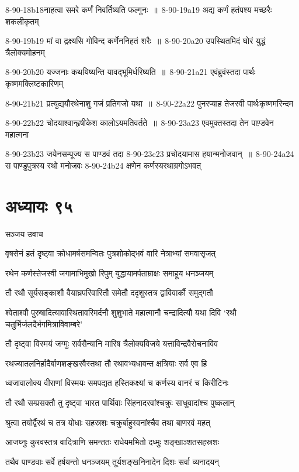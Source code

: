 8-90-18b18नाहत्वा समरे कर्णं निवर्तिष्यति फल्गुनः ॥ 8-90-19a19 अद्य कर्णं हतंपश्य मच्छरैः शकलीकृतम्

8-90-19b19 मां वा द्रक्ष्यसि गोविन्द कर्णेननिहतं शरैः ॥ 8-90-20a20 उपस्थितमिदं घोरं युद्धं त्रैलोक्यमोहनम्

8-90-20b20 यज्जनाः कथयिष्यन्ति यावद्भूमिर्धरिष्यति ॥ 8-90-21a21 एवंब्रुवंस्तदा पार्थः कृष्णमक्लिष्टकारिणम्

8-90-21b21 प्रत्युद्ययौरथेनाशु गजं प्रतिगजो यथा ॥ 8-90-22a22 पुनरप्याह तेजस्वी पार्थःकृष्णमरिन्दम

8-90-22b22 चोदयाश्वान्हृषीकेश कालोऽयमतिवर्तते ॥ 8-90-23a23 एवमुक्तस्तदा तेन पाण़्डवेन महात्मना

8-90-23b23 जयेनसम्पूज्य स पाण्डवं तदा 8-90-23c23 प्रचोदयामास हयान्मनोजवान् ॥ 8-90-24a24 स पाण्डुपुत्रस्य रथो मनोजवः 8-90-24b24 क्षणेन कर्णस्यरथाग्रगोऽभवत्
\chapter{अध्यायः ९५}
\twolineshloka
{सञ्जय उवाच}
{}


\twolineshloka
{वृषसेनं हतं दृष्ट्वा क्रोधामर्षसमन्वितः}
{पुत्रशोकोद्भवं वारि नेत्राभ्यां समवासृजत्}


\twolineshloka
{रथेन कर्णस्तेजस्वी जगामाभिमुखो रिपुम्}
{युद्धायामर्पताम्राक्षः समाहूय धनञ्जयम्}


\twolineshloka
{तौ रथौ सूर्यसङ्काशौ वैयाघ्रपरिवारितौ}
{समेतौ ददृशुस्तत्र द्वाविवार्कौ समुद्गतौ}


\threelineshloka
{श्वेताश्वौ पुरुषादित्यावास्थितावरिमर्दनौ}
{शुशुभाते महात्मानौ चन्द्रादित्यौ यथा दिवि}
{`रथौ चतुर्भिर्जलदैर्भगमित्राविवाम्बरे'}


\twolineshloka
{तौ दृष्ट्वा विस्मयं जग्मुः सर्वसैन्यानि मारिष}
{त्रैलोक्यविजये यत्ताविन्द्रवैरोचनाविव}


\twolineshloka
{रथज्यातलनिर्हादैर्बाणशङ्खरवैस्तथा}
{तौ रथावभ्यधावन्त क्षत्रियाः सर्व एव हि}


\twolineshloka
{ध्वजावालोक्य वीराणां विस्मयः समपद्यत}
{हस्तिकक्ष्यां च कर्णस्य वानरं च किरीटिनः}


\twolineshloka
{तौ रथौ सम्प्रसक्तौ तु दृष्ट्वा भारत पार्थिवाः}
{सिंहनादरवांश्चक्रुः साधुवादांश्च पुष्कलान्}


\twolineshloka
{श्रुत्वा तयोर्द्वैरथं च तत्र योधाः सहस्रशः}
{चक्रुर्बाहुस्वनांश्चैव तथा बाणरवं महत्}


\twolineshloka
{आजघ्नुः कुरवस्तत्र वादित्राणि समन्ततः}
{राधेयमभितो दध्मुः शङ्खाञ्शतसहस्रशः}


\twolineshloka
{तथैव पाण्डवाः सर्वे हर्षयन्तो धनञ्जयम्}
{तूर्यशङ्खनिनादेन दिशः सर्वा व्यनादयन्}


